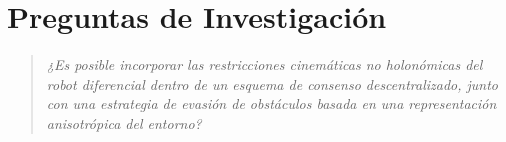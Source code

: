 \section{Preguntas de Investigación}
\setlength{\columnseprule}{0pt}
\onecolumn
\begin{quote}
\textit{¿Es posible incorporar las restricciones cinemáticas no holonómicas del robot diferencial dentro de un esquema de consenso descentralizado, junto con una estrategia de evasión de obstáculos basada en una representación anisotrópica del entorno?}
\end{quote}
